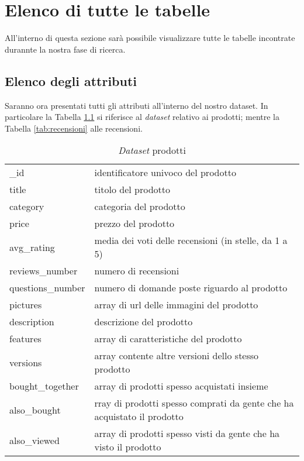 \chapter{Elenco di tutte le tabelle}	
\label{cap:Tabelle}
	All'interno di questa sezione sarà possibile visualizzare tutte le tabelle incontrate durannte la nostra fase di ricerca.
	
	\section{Elenco degli attributi}
		Saranno ora presentati tutti gli attributi all'interno del nostro dataset. In particolare la Tabella \ref{tab:prodotti} si riferisce al \textit{dataset} relativo ai prodotti; mentre la Tabella \ref{tab:recensioni} alle recensioni.
		\begin{table}[H]
			\caption{\textit{Dataset} prodotti}
			\label{tab:prodotti}
			\centering
			\begin{tabular}{ll}
				\toprule 
				\_id  & identificatore univoco del prodotto\\
				title  & titolo del prodotto \\
				category  & categoria del prodotto \\
				price  & prezzo del prodotto \\
				avg\_rating  & media dei voti delle recensioni (in stelle, da 1 a 5) \\
				reviews\_number  & numero di recensioni \\
				questions\_number  & numero di domande poste riguardo al prodotto \\
				pictures  & array di url delle immagini del prodotto \\
				description  & descrizione del prodotto \\
				features  & array di caratteristiche del prodotto \\
				versions  & array contente altre versioni dello stesso prodotto \\
				bought\_together  & array di prodotti spesso acquistati insieme \\
				also\_bought  & rray di prodotti spesso comprati da gente che ha acquistato il prodotto \\
				also\_viewed  & array di prodotti spesso visti da gente che ha visto il prodotto \\	
				\bottomrule
			\end{tabular}
		\end{table}
	
